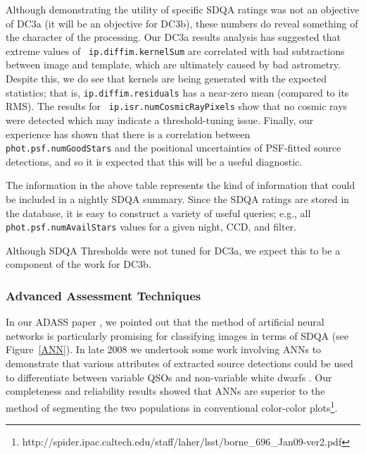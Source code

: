 Although demonstrating the utility of specific SDQA ratings was not an
objective of DC3a (it will be an objective for DC3b), these numbers do
reveal something of the character of the processing.  Our DC3a results
analysis has suggested that extreme values of {\tt
  ip.diffim.kernelSum} are correlated with bad subtractions between
image and template, which are ultimately caused by bad astrometry.
Despite this, we do see that kernels are being generated with the
expected statistics; that is, {\tt ip.diffim.residuals} has a
near-zero mean (compared to its RMS).   The results for {\tt
  ip.isr.numCosmicRayPixels} show that no cosmic rays were detected
which may indicate a threshold-tuning issue.  Finally, our experience
has shown that there is a correlation between {\tt
  phot.psf.numGoodStars} and the positional uncertainties of
PSF-fitted source detections, and so it is expected that this will be 
a useful diagnostic.

The information in the above table represents the kind of information
that could be included in a nightly SDQA summary.  Since the SDQA
ratings are stored in the database, it is easy to construct a variety
of useful queries; e.g., all {\tt phot.psf.numAvailStars} values for a
given night, CCD, and filter.

Although SDQA Thresholds were not tuned for DC3a, we expect this to be
a component of the work for DC3b.


\subsubsection{Advanced Assessment Techniques}

In our ADASS paper \citet{laher08}, we pointed out that the method of 
artificial neural networks is particularly promising for classifying images in 
terms of SDQA (see Figure~\ref{ANN}).  In late 2008 we undertook some work 
involving ANNs to demonstrate that various attributes of extracted
source detections could be used to differentiate between variable QSOs
and non-variable white dwarfs \citet{borne09}.  Our completeness and
reliability results showed that ANNs  are superior to the method of
segmenting the two populations in conventional color-color plots\footnote{
http://spider.ipac.caltech.edu/staff/laher/lsst/borne\_696\_Jan09-ver2.pdf
}.


